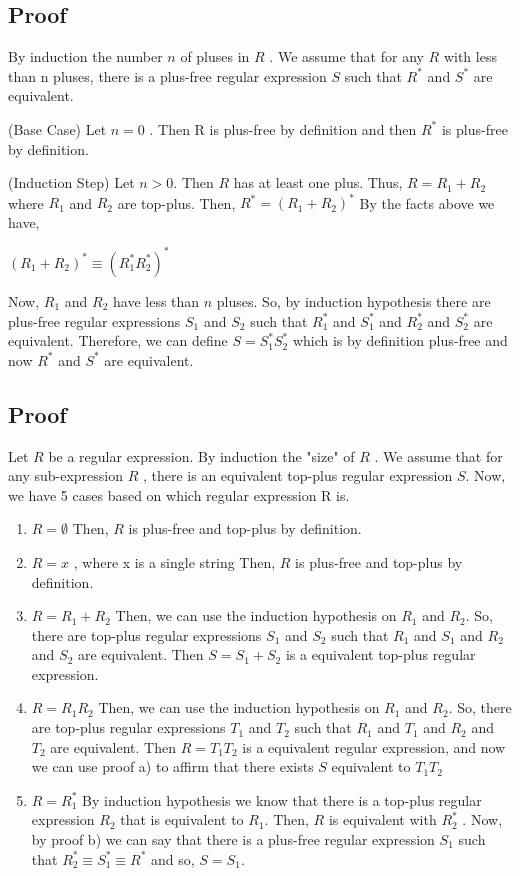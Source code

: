 \documentclass[12pt]{article}
\begin{document}
\subsection{Proof}

By induction the number $n$ of pluses in $R$ . We assume that for any $R$ with less than n pluses, there is a plus-free regular expression $S$ such that $R^*$ and $S^*$ are equivalent.

(Base Case) Let $n=0$ .
Then R is plus-free by definition and then $R^*$ is plus-free by definition.

(Induction Step) Let $n>0$.
Then $R$ has at least one plus. Thus, $R= R_1 +R_2$ where $R_1$ and $R_2$ are top-plus. Then, $R^*=(R_1+R_2)^*$
By the facts above we have, 
\begin{center}
    $(R_1+R_2)^* \equiv (R_1^*R_2^*)^*$
\end{center}
Now,  $R_1$ and $R_2$ have less than $n$ pluses. So, by induction hypothesis there are plus-free regular expressions  $S_1$ and $S_2$ such that $R_1^*$ and $S_1^*$ 
 and $R_2^*$ and $S_2^*$ are equivalent. Therefore, we can define $S=S_1^*S_2^*$ which is by definition plus-free and now $R^*$ and $S^*$ are equivalent.

 \subsection{Proof}

 Let $R$ be a regular expression. By induction the "size" of $R$ . We assume that for any  sub-expression $R$ , there is an equivalent top-plus regular expression $S$. Now, we have 5 cases based on which regular expression R is.
\begin{enumerate}
    \item $R=\emptyset$ 
Then, $R$ is plus-free and top-plus by definition.
\item $R = x$ , where x is a single string
Then, $R$ is plus-free and top-plus by definition.
    \item $R=R_1+R_2$ 
Then, we can use the induction hypothesis on $R_1$ and $R_2$. So, there are top-plus regular expressions  $S_1$ and $S_2$ such that $R_1$ and $S_1$ 
 and $R_2$ and $S_2$ are equivalent. Then $S= S_1 +S_2$ is a equivalent top-plus regular expression.
    \item $R=R_1R_2$
Then, we can use the induction hypothesis on $R_1$ and $R_2$. So, there are top-plus regular expressions  $T_1$ and $T_2$ such that $R_1$ and $T_1$ 
 and $R_2$ and $T_2$ are equivalent. Then $R=T_1T_2$ is a equivalent regular expression, and now we can use proof a) to affirm that there exists $S$ equivalent to $T_1T_2$ 
    \item $R=R_1^*$
By induction hypothesis we know that there is a top-plus regular expression $R_2$ that is equivalent to $R_1$. Then, $R$ is equivalent with $R_2^*$ . Now, by proof b) we can say that there is a plus-free regular expression $S_1$ such that $R_2^* \equiv S_1^* \equiv R^*$ and so, $S = S_1$. 
 \end{enumerate}
 
\end{document}
